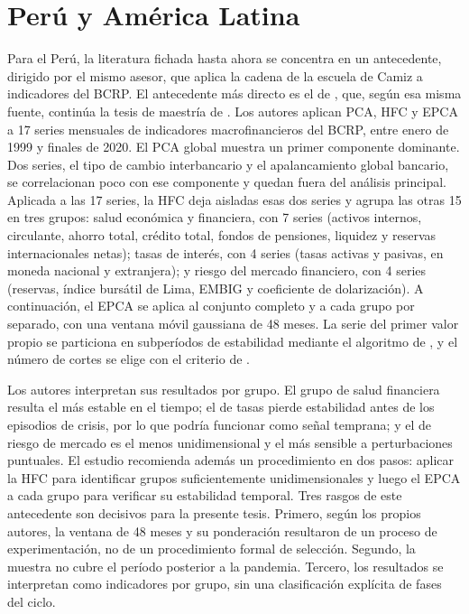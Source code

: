 \section{Perú y América Latina}
\label{sec:antecedentes}

Para el Perú, la literatura fichada hasta ahora se concentra en un antecedente, dirigido por el
mismo asesor, que aplica la cadena de la escuela de Camiz a indicadores del BCRP. El antecedente
más directo es el de
\textcite{camiz_cerda_atoche_2026}, que,
según esa misma fuente, continúa la tesis de maestría de
\textcite{atoche_murrieta_2022}. Los autores aplican PCA, HFC y EPCA a 17
series mensuales de indicadores macrofinancieros del BCRP, entre enero de 1999 y finales de 2020.
El PCA global muestra un primer componente dominante. Dos series, el tipo de cambio interbancario
y el apalancamiento global bancario, se correlacionan poco con ese componente y quedan fuera del
análisis principal. Aplicada a las 17 series, la HFC deja aisladas esas dos series y agrupa las
otras 15 en tres grupos: salud económica y financiera, con 7 series (activos internos,
circulante, ahorro total, crédito total, fondos de pensiones, liquidez y reservas internacionales
netas); tasas de interés, con 4 series (tasas activas y pasivas, en moneda nacional y
extranjera); y riesgo del mercado financiero, con 4 series (reservas, índice bursátil de Lima,
EMBIG y coeficiente de dolarización). A continuación, el EPCA se aplica al conjunto completo y a cada
grupo por separado, con una ventana móvil gaussiana de 48 meses. La serie del primer valor propio
se particiona en subperíodos de estabilidad mediante el algoritmo de
\textcite{fisher_1958}, y el número de cortes se elige con el criterio de
\textcite{calinski_harabasz_1974}.

Los autores interpretan sus resultados por grupo. El grupo de salud financiera resulta el más
estable en el tiempo; el de tasas pierde estabilidad antes de los episodios de crisis, por lo que
podría funcionar como señal temprana; y el de riesgo de mercado es el menos unidimensional y el
más sensible a perturbaciones puntuales. El estudio recomienda además un procedimiento en dos
pasos: aplicar la HFC para identificar grupos suficientemente unidimensionales y luego el EPCA a
cada grupo para verificar su estabilidad temporal. Tres rasgos de este antecedente son decisivos
para la presente tesis. Primero, según los propios autores, la ventana de 48 meses y su
ponderación resultaron de un proceso de experimentación, no de un procedimiento formal de
selección. Segundo, la muestra no cubre el período posterior a la pandemia. Tercero, los
resultados se interpretan como indicadores por grupo, sin una clasificación explícita de fases
del ciclo.

